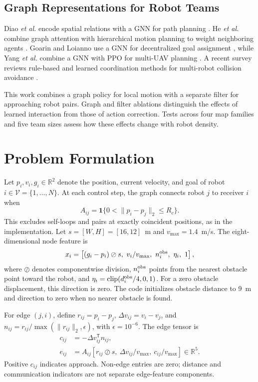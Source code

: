 \documentclass[conference]{IEEEtran}
\begin{document}
\subsection{Graph Representations for Robot Teams}
Diao \textit{et al.} encode spatial relations with a GNN for path planning
\cite{diao2024gnn}. He \textit{et al.} combine graph attention with
hierarchical motion planning to weight neighboring agents
\cite{he2023ganav}. Goarin and Loianno use a GNN for decentralized goal
assignment \cite{goarin2024assignment}, while Yang \textit{et al.} combine
a GNN with PPO for multi-UAV planning \cite{yang2025uav}. A recent survey
reviews rule-based and learned coordination methods for multi-robot
collision avoidance \cite{yang2025survey}.

This work combines a graph policy for local motion with a separate filter
for approaching robot pairs. Graph and filter ablations distinguish the
effects of learned interaction from those of action correction. Tests across
four map families and five team sizes assess how these effects change with
robot density.

\section{Problem Formulation}

Let $p_i,v_i,g_i\in\mathbb{R}^2$ denote the position, current velocity,
and goal of robot $i\in\mathcal V=\{1,\ldots,N\}$. At each control step,
the graph connects robot $j$ to receiver $i$ when
\begin{equation}
A_{ij}=\mathbf{1}\{0<\|p_i-p_j\|_2\le R_c\}.
\end{equation}
This excludes self-loops and pairs at exactly coincident positions, as in
the implementation. Let $s=[W,H]=[16,12]$~m and $v_{\max}=1.4$~m/s.
The eight-dimensional node feature is
\begin{equation}
x_i=\left[(g_i-p_i)\oslash s,\ v_i/v_{\max},\ n_i^{\rm obs},\
\eta_i,\ 1\right],
\end{equation}
where $\oslash$ denotes componentwise division, $n_i^{\rm obs}$ points
from the nearest obstacle point toward the robot, and
$\eta_i=\operatorname{clip}(d_i^{\rm obs}/4,0,1)$. For a zero obstacle
displacement, this direction is zero. The code initializes obstacle
distance to 9~m and direction to zero when no nearer obstacle is found.

For edge $(j,i)$, define $r_{ij}=p_i-p_j$, $\Delta v_{ij}=v_i-v_j$,
and $n_{ij}=r_{ij}/\max(\|r_{ij}\|_2,\epsilon)$, with
$\epsilon=10^{-6}$. The edge tensor is
\begin{equation}
\begin{aligned}
c_{ij}&=-\Delta v_{ij}^{\mathsf T}n_{ij},\\
e_{ij}&=A_{ij}\left[r_{ij}\oslash s,\ \Delta v_{ij}/v_{\max},\
c_{ij}/v_{\max}\right]\in\mathbb R^5.
\end{aligned}
\end{equation}
Positive $c_{ij}$ indicates approach. Non-edge entries are zero; distance
and communication indicators are not separate edge-feature components.
\end{document}
